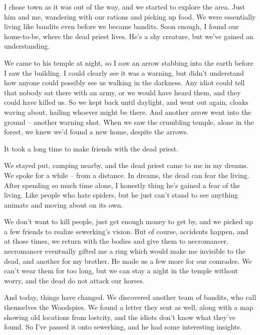 \begin{multicols}{2}
\begin{exampletext}
  I chose \gls{town} as it was out of the way, and we started to explore the area.
  Just him and me, wandering with our rations and picking up food.
  We were essentially living like bandits even before we became bandits.
  Soon enough, I found our home-to-be, where the dead priest lives.
  He's a shy creature, but we've gained an understanding.

  We came to his temple at night, so I saw an arrow stabbing into the earth before I saw the building.
  I could clearly see it was a warning, but didn't understand how anyone could possibly see us walking in the darkness.
  Any idiot could tell that nobody sat there with an army, or we would have heard them, and they could have killed us.
  So we kept back until daylight, and went out again, cloaks waving about, hailing whoever might be there.
  And another arrow went into the ground -- another warning shot.
  When we saw the crumbling temple, alone in the forest, we knew we'd found a new home, despite the arrows.

  It took a long time to make friends with the dead priest.

  We stayed put, camping nearby, and the dead priest came to me in my dreams.
  We spoke for a while -- from a distance.
  In dreams, the dead can fear the living.
  After spending so much time alone, I honestly thing he's gained a fear of the living.
  Like people who hate spiders, but he just can't stand to see anything animate and moving about on its own.

  We don't want to kill people, just get enough money to get by, and we picked up a few friends to realize \gls{sewerking}'s vision.
  But of course, accidents happen, and at those times, we return with the bodies and give them to \gls{necromancer}.
  \Gls{necromancer} eventually gifted me a ring which would make me invisible to the dead, and another for my brother.
  He made us a few more for our comrades.
  We can't wear them for too long, but we can stay a night in the temple without worry, and the dead do not attack our horses.

  And today, things have changed.
  We discovered another team of bandits, who call themselves the Woodspies.
  We found a letter they sent as well, along with a map showing old locations from \gls{lostcity}, and the idiots don't know what they've found.
  So I've passed it onto \gls{sewerking}, and he had some interesting insights.

\end{exampletext}


\end{multicols}
